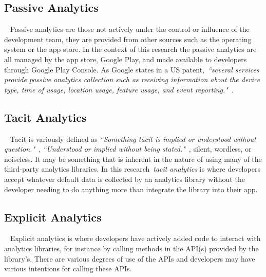 

\subsection{Passive Analytics}~\label{subsection-passive-analytics}
Passive analytics are those not actively under the control or influence of the development team, they are provided from other sources such as the operating system or the app store. In the context of this research the passive analytics are all managed by the app store, Google Play, and made available to developers through Google Play Console. As Google states in a US patent,~\emph{``several services provide passive analytics collection such as receiving information about the device type, time of usage, location usage, feature usage, and event reporting."}~.  


\subsection{Tacit Analytics}~\label{subsection-tacit-analytics}
Tacit is variously defined as \emph{``Something tacit is implied or understood without question."}~, \emph{``Understood or implied without being stated."}~, silent, wordless, or noiseless. 
%
It may be something that is inherent in the nature of using many of the third-party analytics libraries. In this research~\emph{tacit analytics} is where developers accept whatever default data is collected by an analytics library without the developer needing to do anything more than integrate the library into their app. 

\subsection{Explicit Analytics}~\label{subsection-explicit-analytics}
Explicit analytics is where developers have actively added code to interact with analytics libraries, for instance by calling methods in the API(s) provided by the library's. There are various degrees of use of the APIs and developers may have various intentions for calling these APIs.

